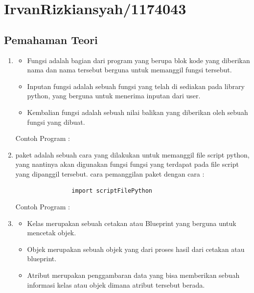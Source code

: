 
\section{IrvanRizkiansyah/1174043}
	\subsection{Pemahaman Teori}
		\begin{enumerate}
			\item	\begin{itemize}
						\item Fungsi adalah bagian dari program yang berupa blok kode yang diberikan nama dan nama tersebut berguna untuk memanggil fungsi tersebut.
					
						\item Inputan fungsi adalah sebuah fungsi yang telah di sediakan pada library python, yang berguna untuk menerima inputan dari user.
					
						\item Kembalian fungsi adalah sebuah nilai balikan yang diberikan oleh sebuah fungsi yang dibuat.
					\end{itemize}
					
					Contoh Program : 
					
					
			\item paket adalah sebuah cara yang dilakukan untuk memanggil file script python, yang nantinya akan digunakan fungsi fungsi yang terdapat pada file script yang dipanggil tersebut. cara pemanggilan paket dengan cara :
				\begin{verbatim}
				import scriptFilePython
				\end{verbatim}
			
			Contoh Program :
			
			
			\item	\begin{itemize}
						\item Kelas merupakan sebuah cetakan atau Blueprint yang berguna untuk mencetak objek.
						
						\item Objek merupakan sebuah objek yang dari proses hasil dari cetakan atau blueprint.
						
						\item Atribut merupakan penggambaran data yang bisa memberikan sebuah informasi kelas atau objek dimana atribut tersebut berada.
						

\end{itemize}
\end{enumerate}
